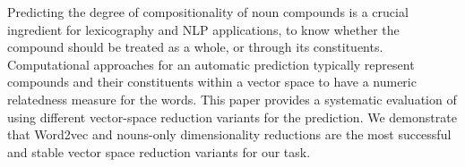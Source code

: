 Predicting the degree of compositionality of noun compounds is a crucial ingredient for lexicography and NLP applications, to know whether the compound should be treated as a whole, or through its constituents.  Computational approaches for an automatic prediction typically represent compounds and their constituents within a vector space to have a numeric relatedness measure for the words.  This paper provides a systematic evaluation of using different vector-space reduction variants for the prediction.   We demonstrate that Word2vec and nouns-only dimensionality reductions are the most successful and stable vector space reduction variants for our task.
